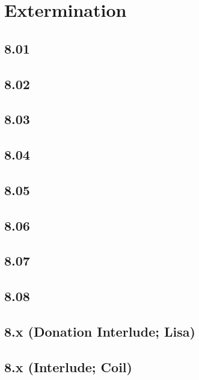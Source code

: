 \part{Extermination}
 \chapter{8.01}
 \chapter{8.02}
 \chapter{8.03}
 \chapter{8.04}
 \chapter{8.05}
 \chapter{8.06}
 \chapter{8.07}
 \chapter{8.08}
 \chapter{8.x (Donation Interlude; Lisa)}
 \chapter{8.x (Interlude; Coil)}












